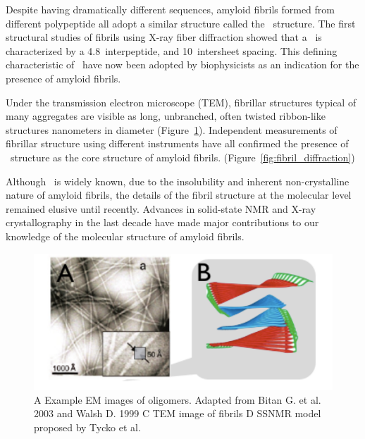 
Despite having dramatically different sequences, amyloid fibrils formed from different polypeptide all adopt a similar structure called the \crossb\ structure.  The first structural studies of fibrils using X-ray fiber diffraction showed that a \crossb\ is characterized by a 4.8\angstrom\ interpeptide, and 10\angstrom\ intersheet spacing.  This defining characteristic of \crossb\ have now been adopted by biophysicists as an indication for the presence of amyloid fibrils.


Under the transmission electron microscope (TEM), fibrillar structures typical of many aggregates are visible as long, unbranched, often twisted ribbon-like structures nanometers in diameter (Figure~\ref{fig:fibril_TEM_SSNMR}). Independent measurements of fibrillar structure using different instruments have all confirmed the presence of \crossb\ structure as the core structure of amyloid fibrils. (Figure~\ref{fig:fibril_diffraction})


Although \crossb\ is widely known, due to the insolubility and inherent non-crystalline nature of amyloid fibrils, the details of the fibril structure at the molecular level remained elusive until recently. Advances in solid-state NMR and X-ray crystallography in the last decade have made major contributions to our knowledge of the molecular structure of amyloid fibrils.

\begin{figure}
  \centering
  \includegraphics[width=6in]{figures/introduction/fibril_TEM_SSNMR.pdf}
  \caption[Characteristic cross-$\beta$ spacings from X-ray fibre diffraction studies of amyloid fibrils]{A Example EM images of oligomers.  Adapted from Bitan G. et al. 2003 and Walsh D. 1999 C TEM image of fibrils D SSNMR model proposed by Tycko et al.}
  \label{fig:fibril_TEM_SSNMR}
\end{figure}

